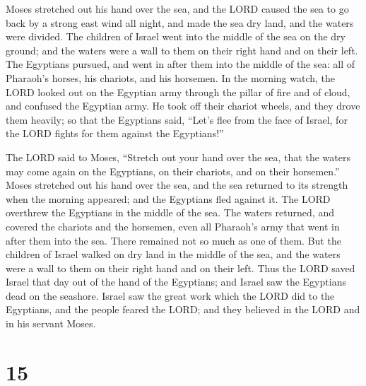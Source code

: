  Moses stretched out his hand over the sea, and the LORD
caused the sea to go back by a strong east wind all night, and made the
sea dry land, and the waters were divided.  The children of
Israel went into the middle of the sea on the dry ground; and the waters
were a wall to them on their right hand and on their left. 
The Egyptians pursued, and went in after them into the middle of the
sea: all of Pharaoh's horses, his chariots, and his horsemen.
 In the morning watch, the LORD looked out on the Egyptian
army through the pillar of fire and of cloud, and confused the Egyptian
army.  He took off their chariot wheels, and they drove
them heavily; so that the Egyptians said, ``Let's flee from the face of
Israel, for the LORD fights for them against the Egyptians!''

 The LORD said to Moses, ``Stretch out your hand over the
sea, that the waters may come again on the Egyptians, on their chariots,
and on their horsemen.''  Moses stretched out his hand over
the sea, and the sea returned to its strength when the morning appeared;
and the Egyptians fled against it. The LORD overthrew the Egyptians in
the middle of the sea.  The waters returned, and covered
the chariots and the horsemen, even all Pharaoh's army that went in
after them into the sea. There remained not so much as one of them.
 But the children of Israel walked on dry land in the
middle of the sea, and the waters were a wall to them on their right
hand and on their left.  Thus the LORD saved Israel that
day out of the hand of the Egyptians; and Israel saw the Egyptians dead
on the seashore.  Israel saw the great work which the LORD
did to the Egyptians, and the people feared the LORD; and they believed
in the LORD and in his servant Moses.

\hypertarget{section-14}{%
\section{15}\label{section-14}}

